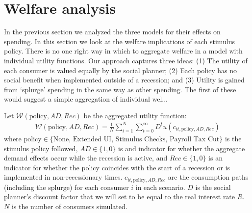 \documentclass[../HAFiscal]{subfiles}
\begin{document}
\section{Welfare analysis}

In the previous section we analyzed the three models for their effects on spending. In this section we look at the welfare implications of each stimulus policy. There is no one right way in which to aggregate welfare in a model with individual utility functions. Our approach captures three ideas: (1) The utility of each consumer is valued equally by the social planner; (2) Each policy has no social benefit when implemented outside of a recession; and (3) Utility is gained from `splurge' spending in the same way as other spending. The first of these would suggest a simple aggregation of individual wel...

Let  $\mathcal{W}(\text{policy},AD,Rec)$ be the aggregated utility function:
\begin{align}
	\mathcal{W}(\text{policy},AD,Rec) =\frac{1}{N}\sum_{i=1}^{N} \sum_{t=0}^{\infty} D^t  u(c_{it,\text{policy},AD,Rec}) 
\end{align}
where $\text{policy}\in \{\text{None, Extended UI, Stimulus Checks, Payroll Tax Cut}\}$ is the stimulus policy followed,  $AD\in\{1,0\}$ is and indicator for whether the aggregate demand effects occur while the recession is active, and  $Rec\in\{1,0\}$ is an indicator for whether the policy coincides with the start of a recession or is implemented in non-recessionary times. $c_{it,\text{policy},AD,Rec}$ are the consumption paths (including the splurge) for each consumer $i$ in each scenario. $D$ is the social planner's discount factor that we will set to be equal to the real interest rate $R$. $N$ is the number of consumers simulated.
\end{document}
